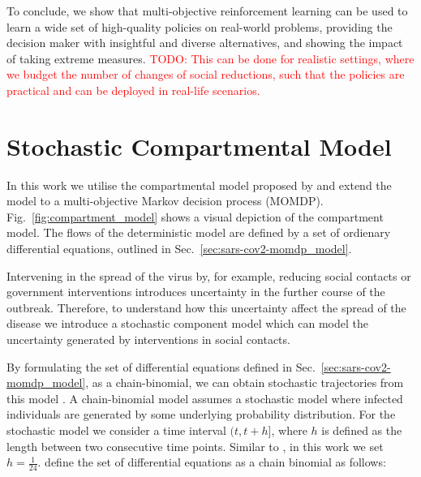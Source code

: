 \documentclass{article}
\renewcommand{\cite}[1]{\citep{#1}}
\newcommand\todo[1]{\textcolor{red}{TODO: #1}}
\begin{document}
To conclude, we show that multi-objective reinforcement learning can be used to learn a wide set of high-quality policies on real-world problems, providing the decision maker with insightful and diverse alternatives, and showing the impact of taking extreme measures. \todo{This can be done for realistic settings, where we budget the number of changes of social reductions, such that the policies are practical and can be deployed in real-life scenarios.}




\appendix
{}

\section{Stochastic Compartmental Model}
\label{sec:binomial-model}
In this work we utilise the compartmental model proposed by \citet{abrams2021modelling} and extend the model to a multi-objective Markov decision process (MOMDP). Fig.~\ref{fig:compartment_model} shows a visual depiction of the compartment model. The flows of the deterministic model are defined by a set of ordienary differential equations, outlined in Sec.~\ref{sec:sars-cov2-momdp_model}.

Intervening in the spread of the virus by, for example, reducing social contacts or government interventions introduces uncertainty in the further course of the outbreak. Therefore, to understand how this uncertainty affect the spread of the disease we introduce a stochastic component model which can model the uncertainty generated by interventions in social contacts. 

By formulating the set of differential equations defined in Sec.~\ref{sec:sars-cov2-momdp_model}, as a chain-binomial, we can obtain stochastic trajectories from this model \cite{bailey1975mathematical}. A chain-binomial model assumes a stochastic model where infected individuals are generated by some underlying probability distribution. For the stochastic model we consider a time interval $(t, t +h]$, where $h$ is defined as the length between two consecutive time points. Similar to \citet{abrams2021modelling}, in this work we set $h = \frac{1}{24}$. \citet{abrams2021modelling} define the set of differential equations as a chain binomial as follows:
\end{document}

